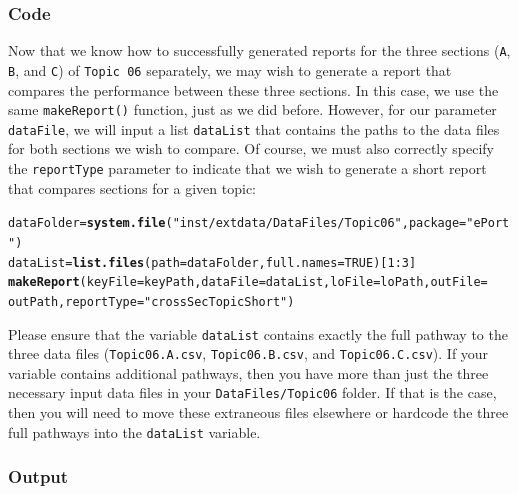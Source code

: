\documentclass{article}\usepackage[]{graphicx}\usepackage[]{color}
\makeatletter
\newcommand{\hlnum}[1]{\textcolor[rgb]{0.686,0.059,0.569}{#1}}%
\newcommand{\hlstr}[1]{\textcolor[rgb]{0.192,0.494,0.8}{#1}}%
\newcommand{\hlopt}[1]{\textcolor[rgb]{0,0,0}{#1}}%
\newcommand{\hlstd}[1]{\textcolor[rgb]{0.345,0.345,0.345}{#1}}%
\newcommand{\hlkwb}[1]{\textcolor[rgb]{0.69,0.353,0.396}{#1}}%
\newcommand{\hlkwc}[1]{\textcolor[rgb]{0.333,0.667,0.333}{#1}}%
\newcommand{\hlkwd}[1]{\textcolor[rgb]{0.737,0.353,0.396}{\textbf{#1}}}%
\newenvironment{kframe}{%
 \def\at@end@of@kframe{}%
 \ifinner\ifhmode%
  \def\at@end@of@kframe{\end{minipage}}%
  \begin{minipage}{\columnwidth}%
 \fi\fi%
 \def\FrameCommand##1{\hskip\@totalleftmargin \hskip-\fboxsep
 \colorbox{shadecolor}{##1}\hskip-\fboxsep
     \hskip-\linewidth \hskip-\@totalleftmargin \hskip\columnwidth}%
 \MakeFramed {\advance\hsize-\width
   \@totalleftmargin\z@ \linewidth\hsize
   \@setminipage}}%
 {\par\unskip\endMakeFramed%
 \at@end@of@kframe}
\newenvironment{knitrout}{}{} %
\numberwithin{equation}{section} %
\makeatother
\begin{document}
\subsubsection{Code}

Now that we know how to successfully generated reports for the three sections (\texttt{A}, \texttt{B}, and \texttt{C}) of \texttt{Topic 06} separately, we may wish to generate a report that compares the performance between these three sections. In this case, we use the same \texttt{makeReport()} function, just as we did before. However, for our parameter \texttt{dataFile}, we will input a list \texttt{dataList} that contains the paths to the data files for both sections we wish to compare. Of course, we must also correctly specify the \texttt{reportType} parameter to indicate that we wish to generate a short report that compares sections for a given topic: \\

\begin{knitrout}
\color{fgcolor}\begin{kframe}
\begin{alltt}
\hlstd{dataFolder} \hlkwb{=} \hlkwd{system.file}\hlstd{(}\hlstr{"inst/extdata/DataFiles/Topic06"}\hlstd{,} \hlkwc{package} \hlstd{=} \hlstr{"ePort"}\hlstd{)}
\hlstd{dataList} \hlkwb{=} \hlkwd{list.files}\hlstd{(}\hlkwc{path} \hlstd{= dataFolder,} \hlkwc{full.names} \hlstd{=} \hlnum{TRUE}\hlstd{)[}\hlnum{1}\hlopt{:}\hlnum{3}\hlstd{]}
\hlkwd{makeReport}\hlstd{(}\hlkwc{keyFile} \hlstd{= keyPath,} \hlkwc{dataFile} \hlstd{= dataList,} \hlkwc{loFile} \hlstd{= loPath,} \hlkwc{outFile} \hlstd{=}
  \hlstd{outPath,} \hlkwc{reportType} \hlstd{=} \hlstr{"crossSecTopicShort"}\hlstd{)}
\end{alltt}
\end{kframe}
\end{knitrout}

Please ensure that the variable \texttt{dataList} contains exactly the full pathway to the three data files (\texttt{Topic06.A.csv}, \texttt{Topic06.B.csv}, and \texttt{Topic06.C.csv}). If your variable contains additional pathways, then you have more than just the three necessary input data files in your \texttt{DataFiles/Topic06} folder. If that is the case, then you will need to move these extraneous files elsewhere or hardcode the three full pathways into the \texttt{dataList} variable. 

\subsubsection{Output}
\end{document}
